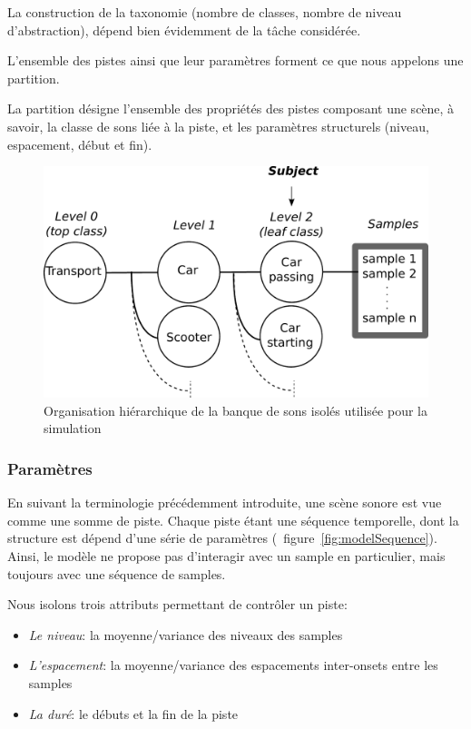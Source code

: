 La construction de la taxonomie (nombre de classes, nombre de niveau d'abstraction), dépend bien évidemment de la tâche considérée. 

L'ensemble des pistes ainsi que leur paramètres forment ce que nous appelons une partition.

\begin{mydef}
La partition désigne l'ensemble des propriétés des pistes composant une scène, à savoir, la classe de sons liée à la piste, et les paramètres structurels (niveau, espacement, début et fin).
\end{mydef}

\begin{figure}[bth]
        \myfloatalign
        \includegraphics[width=.8\linewidth]{gfx/3}
       \caption{Organisation hiérarchique de la banque de sons isolés utilisée pour la simulation}\label{fig:orgDb}
\end{figure}

\subsubsection{Paramètres}
\label{sec:ch4_modelParam}

En suivant la terminologie précédemment introduite, une scène sonore est vue comme une somme de piste. Chaque piste étant une séquence temporelle, dont la structure est dépend d'une série de paramètres (\cf~figure~\ref{fig:modelSequence}). Ainsi, le modèle ne propose pas d’interagir avec un sample en particulier, mais toujours avec une séquence de samples.

Nous isolons trois attributs permettant de contrôler un piste:

\begin{itemize}
\item \emph{Le niveau}: la moyenne/variance des niveaux des samples
\item \emph{L'espacement}: la moyenne/variance des espacements inter-onsets entre les samples
\item \emph{La duré}: le débuts et la fin de la piste
\end{itemize}

